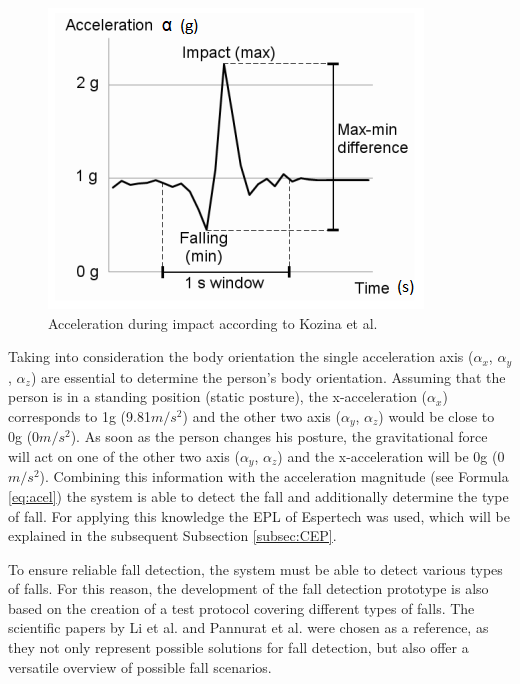 \documentclass[review]{elsarticle}
\begin{document}
\begin{figure}[!ht]
	\centering
	\includegraphics[scale=1.05]{Images/KozinaImpact}
	\caption[Acceleration during impact]{Acceleration during impact according to Kozina et al. ~\cite{Kozina}}
	\label{fig:fallKozina}
\end{figure}
Taking into consideration the body orientation the single acceleration axis ($\alpha_x$, $\alpha_y$, $\alpha_z$) are essential to determine the person's body orientation. Assuming that the person is in a standing position (static posture), the x-acceleration ($\alpha_x$) corresponds to 1g (9.81$m/s^{2}$) and the other two axis ($\alpha_y$, $\alpha_z$) would be close to 0g (0$m/s^{2}$). As soon as the person changes his posture, the gravitational force will act on one of the other two axis ($\alpha_y$, $\alpha_z$) and the x-acceleration will be 0g (0$m/s^{2}$). Combining this information with the acceleration magnitude (see Formula \ref{eq:acel}) the system is able to detect the fall and additionally determine the type of fall. For applying this knowledge the EPL of Espertech \cite{Esper:2016} was used, which will be explained in the subsequent Subsection \ref{subsec:CEP}.

To ensure reliable fall detection, the system must be able to detect various types of falls. For this reason, the development of the fall detection prototype is also based on the creation of a test protocol covering different types of falls. The scientific papers by Li et al. \cite{Li2009} and Pannurat et al. \cite{Pannurat2014} were chosen as a reference, as they not only represent possible solutions for fall detection, but also offer a versatile overview of possible fall scenarios.
\end{document}
